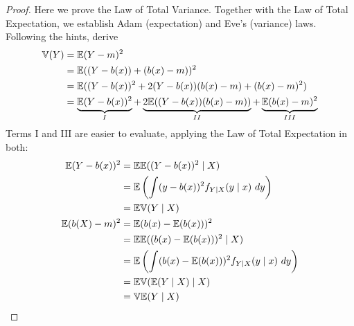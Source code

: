 \documentclass[a4paper]{article}
\begin{document}
\begin{proof}[Proof] 
Here we prove the Law of Total Variance. Together with the Law of Total Expectation, we establish Adam (expectation) and Eve's (variance) laws. Following the hints, derive
\begin{align*}
	\mathbb{V}(Y) & = \mathbb{E}(Y-m)^{2} \\
	 & = \mathbb{E}((Y - b(x)) + (b(x) - m))^{2} \\ 
	 & = \mathbb{E}((Y - b(x))^{2} + 2(Y - b(x))(b(x) - m) + (b(x) - m)^{2}) \\
	 & = \underbrace{\mathbb{E}(Y - b(x))^{2}}_{I} + \underbrace{2 \mathbb{E}((Y - b(x)) (b(x) - m))}_{II} + \underbrace{\mathbb{E}(b(x) - m)^{2}}_{III}		
\end{align*}
Terms I and III are easier to evaluate, applying the Law of Total Expectation in both:
\begin{align*}
	\E(Y - b(x))^{2} & = \E \E((Y - b(x))^{2}  \mid  X) \\
	 & = \E \left( \int (y - b(x))^{2} f_{Y \mid X}(y \mid x)  \ dy  \right)  \\
	 & = \E \var(Y  \mid  X) \\
	\E(b(X) - m)^{2} & = \E(b(x) - \E(b(x)))^{2} \\
	 & = \E \E((b(x) - \E(b(x)))^{2}  \mid  X) \\
	 & = \E \left( \int (b(x) - \E(b(x)))^{2} f_{Y \mid X}(y \mid x)  \ dy  \right) \\
	 & = \E \var(\E(Y \mid X)  \mid  X) \\
	 & = \var \E(Y  \mid  X)
\end{align*}


\end{proof}
\end{document}

